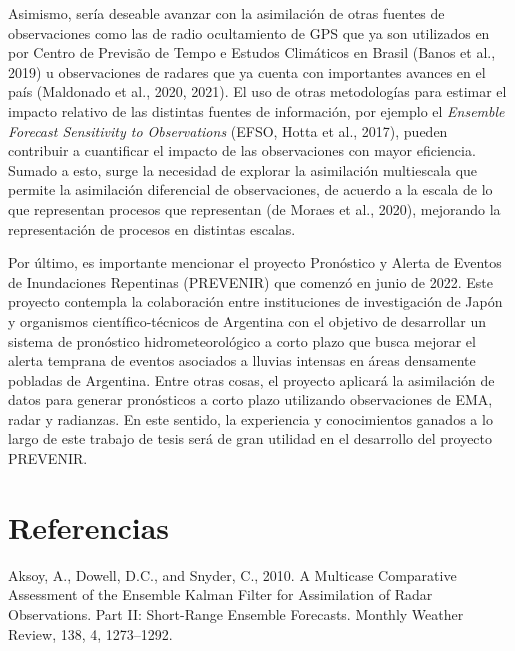 \documentclass[12pt,oneside,a4paper]{reedthesis}
\begin{document}
Asimismo, sería deseable avanzar con la asimilación de otras fuentes de observaciones como las de radio ocultamiento de GPS que ya son utilizados en por Centro de Previsão de Tempo e Estudos Climáticos en Brasil (Banos et al., 2019) u observaciones de radares que ya cuenta con importantes avances en el país (Maldonado et al., 2020, 2021). El uso de otras metodologías para estimar el impacto relativo de las distintas fuentes de información, por ejemplo el \emph{Ensemble Forecast Sensitivity to Observations} (EFSO, Hotta et al., 2017), pueden contribuir a cuantificar el impacto de las observaciones con mayor eficiencia. Sumado a esto, surge la necesidad de explorar la asimilación multiescala que permite la asimilación diferencial de observaciones, de acuerdo a la escala de lo que representan procesos que representan (de Moraes et al., 2020), mejorando la representación de procesos en distintas escalas.

Por último, es importante mencionar el proyecto Pronóstico y Alerta de Eventos de Inundaciones Repentinas (PREVENIR) que comenzó en junio de 2022. Este proyecto contempla la colaboración entre instituciones de investigación de Japón y organismos científico-técnicos de
Argentina con el objetivo de desarrollar un sistema de pronóstico hidrometeorológico a corto plazo que busca mejorar el alerta temprana de eventos asociados a lluvias intensas en áreas densamente pobladas de Argentina. Entre otras cosas, el proyecto aplicará la asimilación de datos para generar pronósticos a corto plazo utilizando observaciones de EMA, radar y radianzas. En este sentido, la experiencia y conocimientos ganados a lo largo de este trabajo de tesis será de gran utilidad en el desarrollo del proyecto PREVENIR.

\backmatter

\hypertarget{referencias}{%
\chapter*{Referencias}\label{referencias}}


\noindent

\setlength{\parindent}{-0.20in}

\hypertarget{refs}{}
\leavevmode\hypertarget{ref-aksoy2010}{}%
Aksoy, A., Dowell, D.C., and Snyder, C., 2010. A Multicase Comparative Assessment of the Ensemble Kalman Filter for Assimilation of Radar Observations. Part II: Short-Range Ensemble Forecasts. Monthly Weather Review, 138, 4, 1273--1292.
\end{document}
